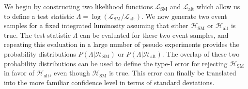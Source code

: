 \documentclass[preprint]{JHEP3} %
\newcommand{\SM}{\mathrm{SM}}
\newcommand{\alt}{\mathrm{alt}}
\def\Halt{\mathcal{H}_{\mathrm{alt}}}
\begin{document}
We begin by constructing two likelihood functions $\mathcal{L}_{\SM}$ and $\mathcal{L}_{\alt}$ which allow us to define a test 
statistic $\Lambda = \log \left( \mathcal{L}_{\SM} / \mathcal{L}_{\alt} \right)$.
We now generate two event samples for a fixed integrated luminosity assuming that either $\mathcal{H}_{\mathrm{SM}}$ or $\Halt$ is true.
The test statistic $\Lambda$ can be evaluated for these two event samples, and 
repeating this evaluation in a large number of pseudo experiments provides the probability distributions $P(\Lambda|\mathcal{H}_{\mathrm{SM}})$ or $P(\Lambda|\Halt)$.
The overlap of these two probability distributions can be used to define the type-I error for rejecting $\mathcal{H}_{\mathrm{SM}}$ in favor of $\Halt$, even though $\mathcal{H}_{\mathrm{SM}}$ is true.
This error can finally be translated into the more familiar confidence level in terms of standard deviations.
\end{document}
